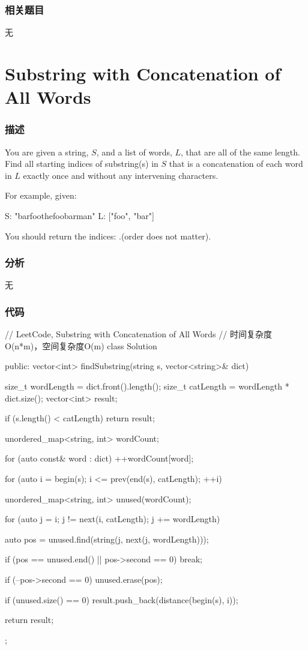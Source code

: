 \subsubsection{相关题目}

\begindot
\item 无
\myenddot


\section{Substring with Concatenation of All Words} %
\label{sec:substring-with-concatenation-of-all-words}


\subsubsection{描述}
You are given a string, $S$, and a list of words, $L$, that are all of the same length. Find all starting indices of substring(s) in $S$ that is a concatenation of each word in $L$ exactly once and without any intervening characters.

For example, given: 
\begin{Code}
S: "barfoothefoobarman"
L: ["foo", "bar"]
\end{Code}

You should return the indices: \code{[0,9]}.(order does not matter).


\subsubsection{分析}
无


\subsubsection{代码}
\begin{Code}
// LeetCode, Substring with Concatenation of All Words
// 时间复杂度O(n*m)，空间复杂度O(m)
class Solution {
public:
    vector<int> findSubstring(string s, vector<string>& dict) {
        size_t wordLength = dict.front().length();
        size_t catLength = wordLength * dict.size();
        vector<int> result;

        if (s.length() < catLength) return result;

        unordered_map<string, int> wordCount;

        for (auto const& word : dict) ++wordCount[word];

        for (auto i = begin(s); i <= prev(end(s), catLength); ++i) {
            unordered_map<string, int> unused(wordCount);

            for (auto j = i; j != next(i, catLength); j += wordLength) {
                auto pos = unused.find(string(j, next(j, wordLength)));

                if (pos == unused.end() || pos->second == 0) break;

                if (--pos->second == 0) unused.erase(pos);
            }

            if (unused.size() == 0) result.push_back(distance(begin(s), i));
        }

        return result;
    }
};
\end{Code}


